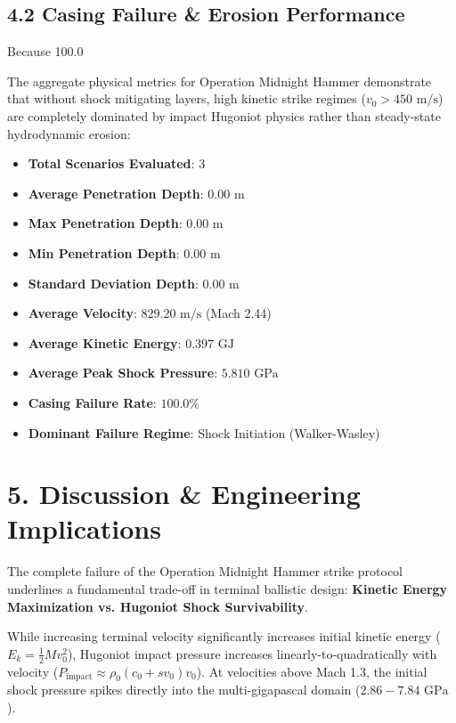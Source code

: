 \documentclass[journal,10pt,twocolumn]{IEEEtran}
\begin{document}
\subsection{4.2 Casing Failure & Erosion Performance}

Because 100.0%

The aggregate physical metrics for Operation Midnight Hammer demonstrate that without shock mitigating layers, high kinetic strike regimes ($v_0 > 450\text{ m/s}$) are completely dominated by impact Hugoniot physics rather than steady-state hydrodynamic erosion:
\begin{itemize}
\item \textbf{Total Scenarios Evaluated}: 3
\item \textbf{Average Penetration Depth}: $0.00\text{ m}$
\item \textbf{Max Penetration Depth}: $0.00\text{ m}$
\item \textbf{Min Penetration Depth}: $0.00\text{ m}$
\item \textbf{Standard Deviation Depth}: $0.00\text{ m}$
\item \textbf{Average Velocity}: $829.20\text{ m/s}$ (Mach 2.44)
\item \textbf{Average Kinetic Energy}: $0.397\text{ GJ}$
\item \textbf{Average Peak Shock Pressure}: $5.810\text{ GPa}$
\item \textbf{Casing Failure Rate}: $100.0\%$
\item \textbf{Dominant Failure Regime}: Shock Initiation (Walker-Wasley)
\end{itemize}



\section{5. Discussion & Engineering Implications}

The complete failure of the Operation Midnight Hammer strike protocol underlines a fundamental trade-off in terminal ballistic design: \textbf{Kinetic Energy Maximization vs. Hugoniot Shock Survivability}.

While increasing terminal velocity significantly increases initial kinetic energy ($E_k = \frac{1}{2} M v_0^2$), Hugoniot impact pressure increases linearly-to-quadratically with velocity ($P_{\text{impact}} \approx \rho_0 (c_0 + s v_0) v_0$). At velocities above Mach 1.3, the initial shock pressure spikes directly into the multi-gigapascal domain ($2.86 - 7.84\text{ GPa}$). 
\end{document}
